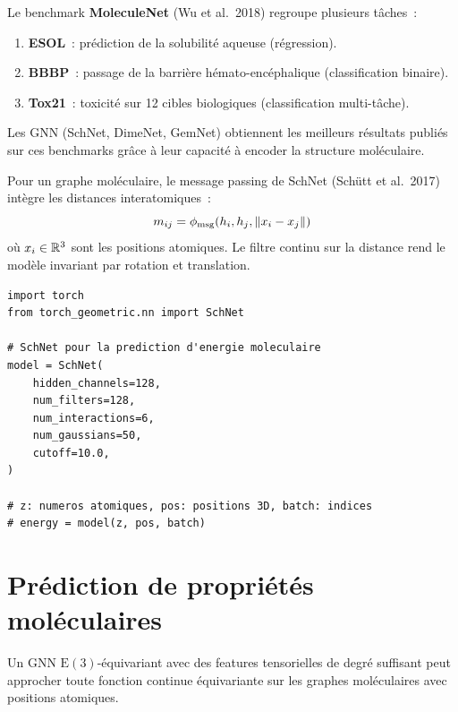 \begin{exemple}
Le benchmark \textbf{MoleculeNet} (Wu et al.\ 2018) regroupe
plusieurs t\^aches~:
\begin{enumerate}
  \item \textbf{ESOL}~: pr\'ediction de la solubilit\'e aqueuse
        (r\'egression).
  \item \textbf{BBBP}~: passage de la barri\`ere h\'emato-enc\'ephalique
        (classification binaire).
  \item \textbf{Tox21}~: toxicit\'e sur 12 cibles biologiques
        (classification multi-t\^ache).
\end{enumerate}
Les GNN (SchNet, DimeNet, GemNet) obtiennent les meilleurs r\'esultats publi\'es sur ces benchmarks gr\^ace
\`a leur capacit\'e \`a encoder la structure mol\'eculaire.
\end{exemple}

\begin{definition}
Pour un graphe mol\'eculaire, le message passing de SchNet
(Sch\"utt et al.\ 2017) int\`egre les distances
interatomiques~:
\[
  m_{ij} = \phi_{\mathrm{msg}}(h_i, h_j, \left\| x_i - x_j \right\|)
\]
o\`u $x_i \in \mathbb{R}^3$ sont les positions atomiques. Le filtre continu
sur la distance rend le mod\`ele invariant par rotation et translation.
\end{definition}

\begin{verbatim}
import torch
from torch_geometric.nn import SchNet

# SchNet pour la prediction d'energie moleculaire
model = SchNet(
    hidden_channels=128,
    num_filters=128,
    num_interactions=6,
    num_gaussians=50,
    cutoff=10.0,
)

# z: numeros atomiques, pos: positions 3D, batch: indices
# energy = model(z, pos, batch)
\end{verbatim}

\section{Pr\'ediction de propri\'et\'es mol\'eculaires}
\label{sec:molecular_properties}

\begin{theoreme}
Un GNN $\mathrm{E}(3)$-\'equivariant avec des features
tensoriel\-les de degr\'e suffisant peut approcher toute fonction
continue \'equivariante sur les graphes mol\'eculaires avec
positions atomiques.
\end{theoreme}

